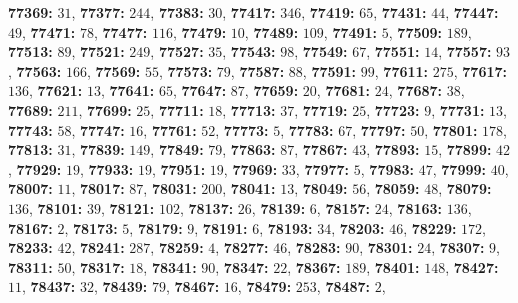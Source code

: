 \textsf{\bfseries 77369:} $31$, \textsf{\bfseries 77377:} $244$, \textsf{\bfseries 77383:} $30$, \textsf{\bfseries 77417:} $346$, \textsf{\bfseries 77419:} $65$, \textsf{\bfseries 77431:} $44$, \textsf{\bfseries 77447:} $49$, \textsf{\bfseries 77471:} $78$, \textsf{\bfseries 77477:} $116$, \textsf{\bfseries 77479:} $10$, \textsf{\bfseries 77489:} $109$, \textsf{\bfseries 77491:} $5$, \textsf{\bfseries 77509:} $189$, \textsf{\bfseries 77513:} $89$, \textsf{\bfseries 77521:} $249$, \textsf{\bfseries 77527:} $35$, \textsf{\bfseries 77543:} $98$, \textsf{\bfseries 77549:} $67$, \textsf{\bfseries 77551:} $14$, \textsf{\bfseries 77557:} $93$, \textsf{\bfseries 77563:} $166$, \textsf{\bfseries 77569:} $55$, \textsf{\bfseries 77573:} $79$, \textsf{\bfseries 77587:} $88$, \textsf{\bfseries 77591:} $99$, \textsf{\bfseries 77611:} $275$, \textsf{\bfseries 77617:} $136$, \textsf{\bfseries 77621:} $13$, \textsf{\bfseries 77641:} $65$, \textsf{\bfseries 77647:} $87$, \textsf{\bfseries 77659:} $20$, \textsf{\bfseries 77681:} $24$, \textsf{\bfseries 77687:} $38$, \textsf{\bfseries 77689:} $211$, \textsf{\bfseries 77699:} $25$, \textsf{\bfseries 77711:} $18$, \textsf{\bfseries 77713:} $37$, \textsf{\bfseries 77719:} $25$, \textsf{\bfseries 77723:} $9$, \textsf{\bfseries 77731:} $13$, \textsf{\bfseries 77743:} $58$, \textsf{\bfseries 77747:} $16$, \textsf{\bfseries 77761:} $52$, \textsf{\bfseries 77773:} $5$, \textsf{\bfseries 77783:} $67$, \textsf{\bfseries 77797:} $50$, \textsf{\bfseries 77801:} $178$, \textsf{\bfseries 77813:} $31$, \textsf{\bfseries 77839:} $149$, \textsf{\bfseries 77849:} $79$, \textsf{\bfseries 77863:} $87$, \textsf{\bfseries 77867:} $43$, \textsf{\bfseries 77893:} $15$, \textsf{\bfseries 77899:} $42$, \textsf{\bfseries 77929:} $19$, \textsf{\bfseries 77933:} $19$, \textsf{\bfseries 77951:} $19$, \textsf{\bfseries 77969:} $33$, \textsf{\bfseries 77977:} $5$, \textsf{\bfseries 77983:} $47$, \textsf{\bfseries 77999:} $40$, \textsf{\bfseries 78007:} $11$, \textsf{\bfseries 78017:} $87$, \textsf{\bfseries 78031:} $200$, \textsf{\bfseries 78041:} $13$, \textsf{\bfseries 78049:} $56$, \textsf{\bfseries 78059:} $48$, \textsf{\bfseries 78079:} $136$, \textsf{\bfseries 78101:} $39$, \textsf{\bfseries 78121:} $102$, \textsf{\bfseries 78137:} $26$, \textsf{\bfseries 78139:} $6$, \textsf{\bfseries 78157:} $24$, \textsf{\bfseries 78163:} $136$, \textsf{\bfseries 78167:} $2$, \textsf{\bfseries 78173:} $5$, \textsf{\bfseries 78179:} $9$, \textsf{\bfseries 78191:} $6$, \textsf{\bfseries 78193:} $34$, \textsf{\bfseries 78203:} $46$, \textsf{\bfseries 78229:} $172$, \textsf{\bfseries 78233:} $42$, \textsf{\bfseries 78241:} $287$, \textsf{\bfseries 78259:} $4$, \textsf{\bfseries 78277:} $46$, \textsf{\bfseries 78283:} $90$, \textsf{\bfseries 78301:} $24$, \textsf{\bfseries 78307:} $9$, \textsf{\bfseries 78311:} $50$, \textsf{\bfseries 78317:} $18$, \textsf{\bfseries 78341:} $90$, \textsf{\bfseries 78347:} $22$, \textsf{\bfseries 78367:} $189$, \textsf{\bfseries 78401:} $148$, \textsf{\bfseries 78427:} $11$, \textsf{\bfseries 78437:} $32$, \textsf{\bfseries 78439:} $79$, \textsf{\bfseries 78467:} $16$, \textsf{\bfseries 78479:} $253$, \textsf{\bfseries 78487:} $2$, 

